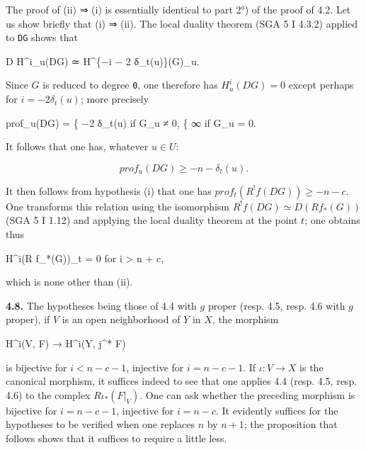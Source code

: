 \documentclass[
  11pt,
  a4paper,
]{book}
\newenvironment{Shaded}{}{}
\newcommand{\NormalTok}[1]{#1}
\newcounter{none} %
\begin{document}
The proof of (ii) ⇒ (i) is essentially identical to part 2°) of the
proof of 4.2. Let us show briefly that (i) ⇒ (ii). The local duality
theorem (SGA 5 I 4.3.2) applied to \texttt{DG} shows that

\begin{Shaded}
\begin{Highlighting}[]
\NormalTok{D H\^{}i\_u(DG) ≃ H\^{}\{−i − 2 δ\_t(u)\}(G)\_u.}
\end{Highlighting}
\end{Shaded}

Since \(G\) is reduced to degree \texttt{0}, one therefore has
\(H^{i}_{u}(DG) = 0\) except perhaps for \(i = -2 \delta_{t}(u)\); more
precisely

\begin{Shaded}
\begin{Highlighting}[]
\NormalTok{prof\_u(DG) = \{ −2 δ\_t(u)  if G\_u ≠ 0,}
\NormalTok{              \{ ∞          if G\_u = 0.}
\end{Highlighting}
\end{Shaded}

It follows that one has, whatever \(u \in U\):

\[ prof_{u}(DG) \geqslant -n - \delta_{t}(u). \]

It then follows from hypothesis (i) that one has
\(prof_{t}(R^{!} f(DG)) \geqslant -n - c\). One transforms this relation
using the isomorphism \(R^{!} f(DG) \simeq D(R f_{*}(G))\) (SGA 5 I
1.12) and applying the local duality theorem at the point \(t\); one
obtains thus

\begin{Shaded}
\begin{Highlighting}[]
\NormalTok{H\^{}i(R f\_*(G))\_t = 0 for i \textgreater{} n + c,}
\end{Highlighting}
\end{Shaded}

which is none other than (ii).

\textbf{4.8.} The hypotheses being those of 4.4 with \(g\) proper (resp.
4.5, resp. 4.6 with \(g\) proper), if \(V\) is an open neighborhood of
\(Y\) in \(X\), the morphism

\begin{Shaded}
\begin{Highlighting}[]
\NormalTok{H\^{}i(V, F) → H\^{}i(Y, j\^{}* F)}
\end{Highlighting}
\end{Shaded}

is bijective for \(i < n - c - 1\), injective for \(i = n - c - 1\). If
\(\iota : V \to X\) is the canonical morphism, it suffices indeed to see
that one applies 4.4 (resp. 4.5, resp. 4.6) to the complex
\(R \iota_{*}(F|_{V})\). One can ask whether the preceding morphism is
bijective for \(i = n - c - 1\), injective for \(i = n - c\). It
evidently suffices for the hypotheses to be verified when one replaces
\(n\) by \(n + 1\); the proposition that follows shows that it suffices
to require a little less.
\end{document}
